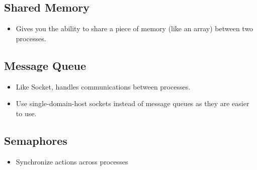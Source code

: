 \documentclass[]{article}
\begin{document}
\subsection{Shared Memory}
\begin{itemize}
\item Gives you the ability to share a piece of memory (like an array) between
two processes.
\end{itemize}

\subsection{Message Queue}
\begin{itemize}
\item Like Socket, handles communications between processes.
\item Use single-domain-host sockets instead of message queues as they are
easier to use.
\end{itemize}

\subsection{Semaphores}
\begin{itemize}
\item Synchronize actions across processes
\end{itemize}
\end{document}

